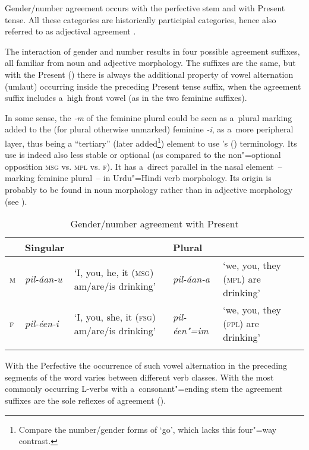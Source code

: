 Gender/number agreement occurs with the perfective stem and with Present tense. All these categories
are historically participial categories, hence also referred to as adjectival agreement
\citep[260]{masica1991}.



The interaction of gender and number results in four possible agreement suffixes, all familiar from noun and adjective morphology. The suffixes are the same, but with the Present () there is always the additional property of vowel alternation (umlaut) occurring inside the preceding Present tense suffix, when the agreement suffix includes a~high front vowel (as in the two feminine suffixes).



In some sense, the \textit{-m} of the feminine plural could be seen as a~plural marking added to the (for plural otherwise unmarked) feminine \textit{-i}, as a~more peripheral layer, thus being a ``tertiary'' (later added\footnote{Compare the number/gender forms of `go', which lacks this four"=way contrast.}) element to use \citeauthor{masica1991}'s (\citeyear[260--261]{masica1991}) terminology. Its use is indeed also less stable or optional (as compared to the non"=optional opposition \textsc{msg} vs. \textsc{mpl} vs. \textsc{f}). It has a~direct parallel in the nasal element~-- marking feminine plural~-- in Urdu"=Hindi verb morphology. Its origin is probably to be found in noun morphology rather than in adjective morphology (see ).


\begin{table}[ht]
\caption{Gender/number agreement with Present}
\begin{tabularx}{\textwidth}{ l l Q l Q }
\lsptoprule
&
Singular &
&
Plural &
\\\hline
\textsc{m} &
\textit{pil-áan-u} &
`I, you, he, it (\textsc{msg}) am/are/is drinking' &
\textit{pil-áan-a} &
`we, you, they (\textsc{mpl}) are drinking'\\
\textsc{f} &
\textit{pil-éen-i} &
`I, you, she, it (\textsc{fsg}) am/are/is drinking' &
\textit{pil-éen"=im} &
`we, you, they (\textsc{fpl}) are drinking'\\\lspbottomrule
\end{tabularx}
\label{tab:8-18}
\end{table}


With the Perfective the occurrence of such vowel alternation in the preceding segments of the word varies between different verb classes. With the most commonly occurring L-verbs with a~consonant"=ending stem the agreement suffixes are the sole reflexes of agreement ().


